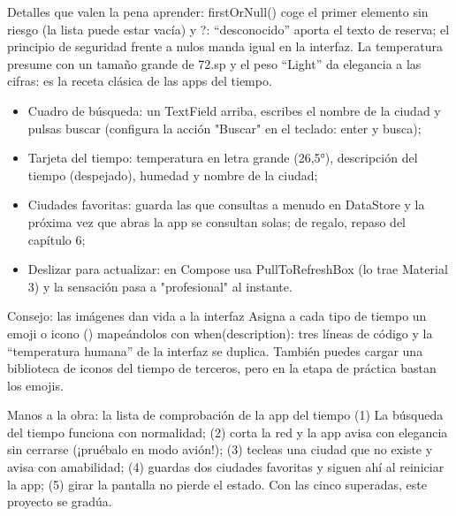 Detalles que valen la pena aprender: firstOrNull() coge el primer elemento sin riesgo (la lista puede estar vacía) y ?: “desconocido” aporta el texto de reserva; el principio de seguridad frente a nulos manda igual en la interfaz. La temperatura presume con un tamaño grande de 72.sp y el peso “Light” da elegancia a las cifras: es la receta clásica de las apps del tiempo.



\begin{itemize}
  \item Cuadro de búsqueda: un TextField arriba, escribes el nombre de la ciudad y pulsas buscar (configura la acción "Buscar" en el teclado: enter y busca);
  \item Tarjeta del tiempo: temperatura en letra grande (26,5°), descripción del tiempo (despejado), humedad y nombre de la ciudad;
  \item Ciudades favoritas: guarda las que consultas a menudo en DataStore y la próxima vez que abras la app se consultan solas; de regalo, repaso del capítulo 6;
  \item Deslizar para actualizar: en Compose usa PullToRefreshBox (lo trae Material 3) y la sensación pasa a "profesional" al instante.
\end{itemize}

\begin{tcbinfo}{Consejo: las imágenes dan vida a la interfaz}
Asigna a cada tipo de tiempo un emoji o icono () mapeándolos con when(description): tres líneas de código y la “temperatura humana” de la interfaz se duplica. También puedes cargar una biblioteca de iconos del tiempo de terceros, pero en la etapa de práctica bastan los emojis.

\end{tcbinfo}

\begin{tcbpractice}{Manos a la obra: la lista de comprobación de la app del tiempo}
(1) La búsqueda del tiempo funciona con normalidad; (2) corta la red y la app avisa con elegancia sin cerrarse (¡pruébalo en modo avión!); (3) tecleas una ciudad que no existe y avisa con amabilidad; (4) guardas dos ciudades favoritas y siguen ahí al reiniciar la app; (5) girar la pantalla no pierde el estado. Con las cinco superadas, este proyecto se gradúa.

\end{tcbpractice}

